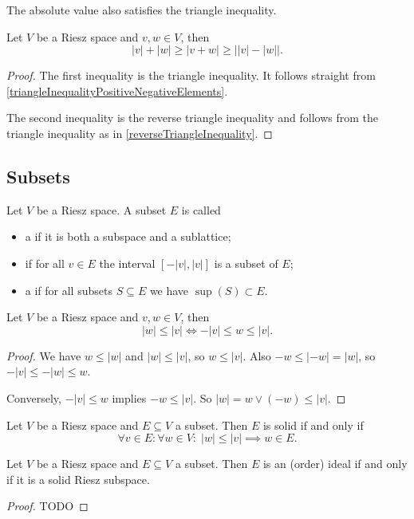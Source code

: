 The absolute value also satisfies the triangle inequality.
\begin{proposition}
Let $V$ be a Riesz space and $v,w\in V$, then
\[ |v| + |w| \geq \big|v+w\big| \geq \big||v|-|w|\big|. \]
\end{proposition}
\begin{proof}
The first inequality is the triangle inequality. It follows straight from \ref{triangleInequalityPositiveNegativeElements}.

The second inequality is the reverse triangle inequality and follows from the triangle inequality as in \ref{reverseTriangleInequality}.
\end{proof}

\subsection{Subsets}
\begin{definition}
Let $V$ be a Riesz space. A subset $E$ is called
\begin{itemize}
\item a  if it is both a subspace and a sublattice;
\item {} if for all $v\in E$ the interval $[-|v|,|v|]$ is a subset of $E$;
\item a  if for all subsets $S\subseteq E$ we have $\sup(S) \subset E$. 
\end{itemize}
\end{definition}

\begin{lemma}
Let $V$ be a Riesz space and $v,w\in V$, then
\[ |w|\leq |v| \iff -|v| \leq w \leq |v|. \]
\end{lemma}
\begin{proof}
We have $w \leq |w|$ and $|w| \leq |v|$, so $w\leq |v|$. Also $-w \leq |-w| = |w|$, so $-|v| \leq -|w| \leq w$.

Conversely, $-|v| \leq w$ implies $-w\leq |v|$. So $|w| = w\vee (-w) \leq |v|$.
\end{proof}
\begin{corollary}
Let $V$ be a Riesz space and $E\subseteq V$ a subset. Then $E$ is solid \textup{if and only if}
\[ \forall v\in E: \forall w\in V: \; |w|\leq |v| \implies w\in E. \]
\end{corollary}

\begin{lemma}
Let $V$ be a Riesz space and $E\subseteq V$ a subset. Then $E$ is an (order) ideal \textup{if and only if} it is a solid Riesz subspace.
\end{lemma}
\begin{proof}
TODO
\end{proof}



